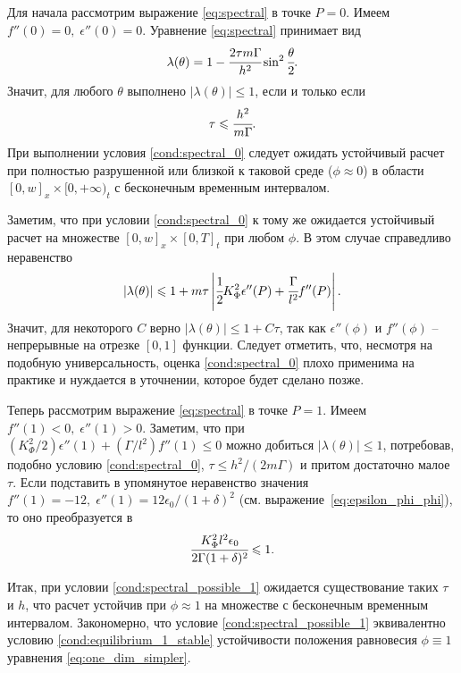 Для начала рассмотрим выражение \eqref{eq:spectral} в точке $P = 0$. Имеем $f''(0) = 0, \; \epsilon''(0) = 0$. Уравнение \eqref{eq:spectral} принимает вид
$$\lambda(\theta) = 1 - \cfrac{2 \tau m \Gamma}{h^2} \sin^2 \cfrac{\theta}{2} {\text{.}}$$
Значит, для любого $\theta$ выполнено $|\lambda(\theta)| \leqslant 1$, если и только если
\begin{equation}
     \tau \leqslant \cfrac{h^2}{m \Gamma} {\text{.}}
     \label{cond:spectral_0}
\end{equation}
При выполнении условия \eqref{cond:spectral_0} следует ожидать устойчивый расчет при полностью разрушенной или близкой к таковой среде ($\phi \approx 0$) в области $[0, w]_x \times [0, +\infty)_t$ с бесконечным временным интервалом.

Заметим, что при условии \eqref{cond:spectral_0} к тому же ожидается устойчивый расчет на множестве $[0, w]_x \times [0, T]_t$ при любом $\phi$. В этом случае справедливо неравенство
$$|\lambda(\theta)| \leqslant 1 + m \tau \left| \cfrac{1}{2} K_\Phi^2 \epsilon''(P) + \cfrac{\Gamma}{l^2} f''(P) \right| {\text{.}}$$
Значит, для некоторого $C$ верно $|\lambda(\theta)| \leqslant 1 + C \tau$, так как $\epsilon''(\phi)$ и $f''(\phi)$ -- непрерывные на отрезке $[0, 1]$ функции. Следует отметить, что, несмотря на подобную универсальность, оценка \eqref{cond:spectral_0} плохо применима на практике и нуждается в уточнении, которое будет сделано позже.

Теперь рассмотрим выражение \eqref{eq:spectral} в точке $P = 1$. Имеем $f''(1) < 0, \; \epsilon''(1) > 0$. Заметим, что при $(K_\Phi^2/2) \epsilon''(1) + (\Gamma/l^2) f''(1) \leqslant 0$ можно добиться $|\lambda(\theta)| \leqslant 1$, потребовав, подобно условию \eqref{cond:spectral_0}, $\tau \leqslant h^2/(2m \Gamma)$ и притом достаточно малое $\tau$. Если подставить в упомянутое неравенство значения $f''(1) = -12, \; \epsilon''(1) = 12 \epsilon_0/(1 + \delta)^2$ (см. выражение~\eqref{eq:epsilon_phi_phi}), то оно преобразуется в
\begin{equation}
    \cfrac{K_\Phi^2 l^2 \epsilon_0}{2 \Gamma (1 + \delta)^2} \leqslant 1 {\text{.}}
    \label{cond:spectral_possible_1}
\end{equation}

Итак, при условии \eqref{cond:spectral_possible_1} ожидается существование таких $\tau$ и $h$, что расчет устойчив при $\phi \approx 1$ на множестве с бесконечным временным интервалом. Закономерно, что условие \eqref{cond:spectral_possible_1} эквивалентно условию \eqref{cond:equilibrium_1_stable} устойчивости положения равновесия $\phi \equiv 1$ уравнения \eqref{eq:one_dim_simpler}.